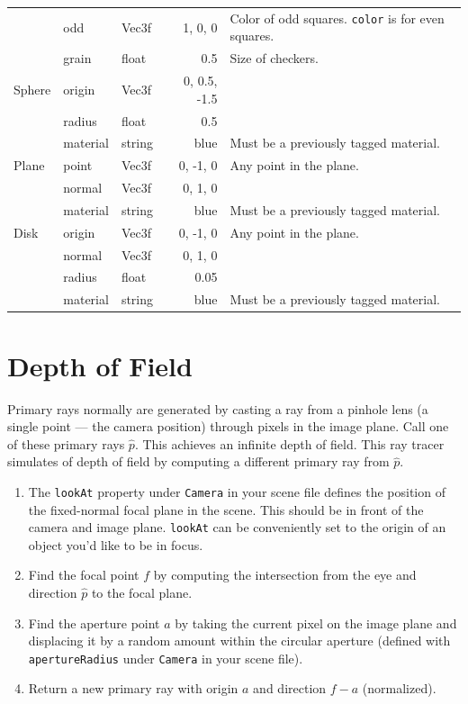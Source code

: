 \documentclass{article}
\begin{document}
\begin{tabular}{p{}llrp{}}
    & odd & Vec3f & 1, 0, 0 & Color of odd squares. \texttt{color} is for even squares.\\
    & grain & float & 0.5 & Size of checkers.\\
    \hline
    Sphere & origin & Vec3f & 0, 0.5, -1.5 &\\
    & radius & float & 0.5 &\\
    & material & string & blue & Must be a previously tagged material.\\
    \hline
    Plane & point & Vec3f & 0, -1, 0 & Any point in the plane.\\
    & normal & Vec3f & 0, 1, 0 &\\
    & material & string & blue & Must be a previously tagged material.\\
    \hline
    Disk & origin & Vec3f & 0, -1, 0 & Any point in the plane.\\
    & normal & Vec3f & 0, 1, 0 &\\
    & radius & float & 0.05 &\\
    & material & string & blue & Must be a previously tagged material.\\
\end{tabular}

\pagebreak

\section{Depth of Field}

Primary rays normally are generated by casting a ray from a pinhole lens (a single point --- the camera position) through pixels in the image plane.
Call one of these primary rays $\hat{p}$.
This achieves an infinite depth of field.
This ray tracer simulates of depth of field by computing a different primary ray from $\hat{p}$.
\begin{enumerate}
    \item The \texttt{lookAt} property under \texttt{Camera} in your scene file defines the position of the fixed-normal focal plane in the scene. This should be in front of the camera and image plane. \texttt{lookAt} can be conveniently set to the origin of an object you'd like to be in focus.
    \item Find the focal point $f$ by computing the intersection from the eye and direction $\hat{p}$ to the focal plane.
    \item Find the aperture point $a$ by taking the current pixel on the image plane and displacing it by a random amount within the circular aperture (defined with \texttt{apertureRadius} under \texttt{Camera} in your scene file).
    \item Return a new primary ray with origin $a$ and direction $f - a$ (normalized).
\end{enumerate}
\end{document}
